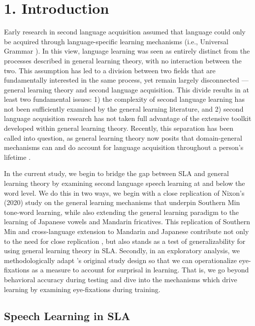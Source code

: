 \section{1. Introduction}

Early research in second language acquisition assumed that language could only be acquired through language-specific learning mechanisms (i.e., Universal Grammar \parencite{chomsky1965}). In this view, language learning was seen as entirely distinct from the processes described in general learning theory, with no interaction between the two. This assumption has led to a division between two fields that are fundamentally interested in the same process, yet remain largely disconnected — general learning theory and second language acquisition. This divide results in at least two fundamental issues: 1) the complexity of second language learning has not been sufficiently examined by the general learning literature, and 2) second language acquisition research has not taken full advantage of the extensive toolkit developed within general learning theory. Recently, this separation has been called into question, as general learning theory now posits that domain-general mechanisms can and do account for language acquisition throughout a person’s lifetime \cite[e.g.,][]{nixon2020mice}.

In the current study, we begin to bridge the gap between SLA and general learning theory by examining second language speech learning at and below the word level. We do this in two ways, we begin with a close replication of Nixon’s (2020) study on the general learning mechanisms that underpin Southern Min tone-word learning, while also extending the general learning paradigm to the learning of Japanese vowels and Mandarin fricatives. This replication of Southern Min and cross-language extension to Mandarin and Japanese contribute not only to the need for close replication \parencite{Marsden_2018}, but also stands as a test of generalizability for using general learning theory in SLA. Secondly, in an exploratory analysis, we methodologically adapt \textcite{nixon2020mice}'s original study design so that we can operationalize eye-fixations as a measure to account for surprisal in learning. That is, we go beyond behavioral accuracy during testing and dive into the mechanisms which drive learning by examining eye-fixations during training. 

\subsection{Speech Learning in SLA}

